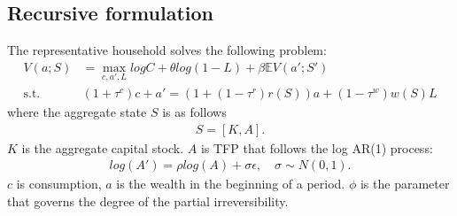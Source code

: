 \subsection*{Recursive formulation}
The representative household solves the following problem:
\begin{align*}
  V(a;S) &= \max_{c,a',L} log C + 
  \theta log(1-L)+ \beta \mathbb{E}V(a';S')
  \\
  \text{s.t. }& 
  (1+\tau^{c})c+a' = (1+(1-\tau^{r})r(S))a + (1-\tau^{w})w(S)L
\end{align*}
where the aggregate state $S$ is as follows
\begin{align*}
  S = [K,A].
\end{align*}
$K$ is the aggregate capital stock. $A$ is TFP that follows the log AR(1) process:
\begin{align*}
  log(A') = \rho log(A) + \sigma\epsilon,\quad\sigma\sim N(0,1).
\end{align*}
$c$ is consumption, $a$ is the wealth in the beginning of a period. $\phi$ is the parameter that governs the degree of the partial irreversibility.

